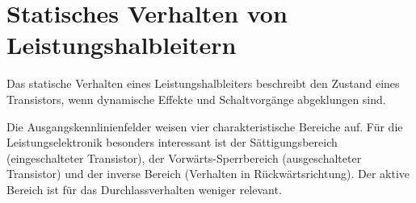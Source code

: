 \section{Statisches Verhalten von Leistungshalbleitern} \label{sec:statisch}

Das statische Verhalten eines Leistungshalbleiters beschreibt den Zustand eines Transistors, wenn dynamische Effekte und Schaltvorgänge abgeklungen sind.

Die Ausgangskennlinienfelder weisen vier charakteristische Bereiche auf. Für die Leistungselektronik besonders interessant ist der Sättigungsbereich (eingeschalteter Transistor), der Vorwärts-Sperrbereich (ausgeschalteter Transistor) und der inverse Bereich (Verhalten in Rückwärtsrichtung). Der aktive Bereich ist für das Durchlassverhalten weniger relevant.

